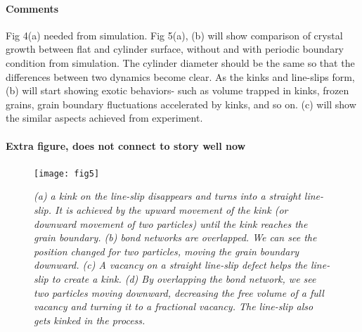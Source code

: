 \documentclass[12pt]{article}
\begin{document}
\paragraph{Comments}
Fig 4(a) needed from simulation. Fig 5(a), (b) will show comparison of crystal growth between flat and cylinder surface, without and with periodic boundary condition from simulation. The cylinder diameter should be the same so that the differences between two dynamics become clear. As the kinks and line-slips form, (b) will start showing exotic behaviors- such as volume trapped in kinks, frozen grains, grain boundary fluctuations accelerated by kinks, and so on. (c) will show the similar aspects achieved from experiment. 

\newpage





\paragraph{Extra figure, does not connect to story well now}


\begin{figure}[!ht]
	\setcounter{topnumber}{1}
	\setcounter{bottomnumber}{1}
	\setcounter{totalnumber}{1}
	\renewcommand{\topfraction}{0.95}
	\renewcommand{\bottomfraction}{0.95}
	\renewcommand{\textfraction}{0.15}
	\renewcommand{\floatpagefraction}{0.9}
    \centering
    \texttt{[image: fig5]}
    \caption{\textit{(a) a kink on the line-slip disappears and turns into a straight line-slip. It is achieved by the upward movement of the kink (or downward movement of two particles) until the kink reaches the grain boundary. (b) bond networks are overlapped. We can see the position changed for two particles, moving the grain boundary downward. (c) A vacancy on a straight line-slip defect helps the line-slip to create a kink. (d)  By overlapping the bond network, we see two particles moving downward, decreasing the free volume of a full vacancy and turning it to a fractional vacancy. The line-slip also gets kinked in the process.   }
    \label{fig6:extra}}
\end{figure}
\end{document}
